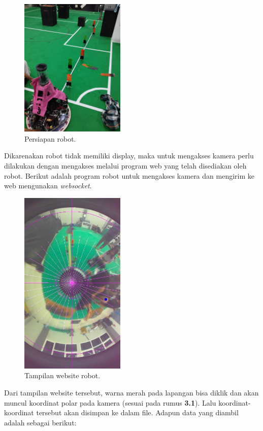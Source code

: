 \begin{figure}[ht]
  \centering
  \includegraphics[width=5cm]{gambar/ambil_data.jpeg}
  \caption{Persiapan robot.}
  \label{fig:persiapanrobot}
\end{figure}

Dikarenakan robot tidak memiliki display, maka untuk mengakses kamera perlu dilakukan dengan mengakses melalui program web yang telah disediakan oleh robot. Berikut adalah program robot untuk mengakses kamera dan mengirim ke web mengunakan \textit{websocket}.

\begin{figure}[ht]
  \centering
  \includegraphics[width=5cm]{gambar/iris_web.jpeg}
  \caption{Tampilan website robot.}
  \label{fig:webrobot}
\end{figure}

Dari tampilan website tersebut, warna merah pada lapangan bisa diklik dan akan muncul koordinat polar pada kamera (sesuai pada rumus \textbf{3.1}). Lalu koordinat-koordinat tersebut akan disimpan ke dalam file. Adapun data yang diambil adalah sebagai berikut:

